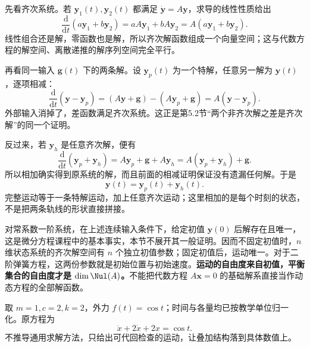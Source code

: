 \documentclass[a4paper,12pt,twoside,openany,fontset=none]{ctexbook}
\numberwithin{equation}{chapter}
\begin{document}
先看齐次系统。若 $\boldsymbol y_1(t),\boldsymbol y_2(t)$ 都满足 $\dot{\boldsymbol y}=A\boldsymbol y$，求导的线性性质给出
\begin{equation}
 \frac{\mathrm d}{\mathrm dt}(a\boldsymbol y_1+b\boldsymbol y_2)
 =aA\boldsymbol y_1+bA\boldsymbol y_2
 =A(a\boldsymbol y_1+b\boldsymbol y_2).
\end{equation}
线性组合还是解，零函数也是解，所以齐次解函数组成一个向量空间；这与代数方程的解空间、离散递推的解序列空间完全平行。

再看同一输入 $\boldsymbol g(t)$ 下的两条解。设 $\boldsymbol y_p(t)$ 为一个特解，任意另一解为 $\boldsymbol y(t)$，逐项相减：
\begin{equation}
 \frac{\mathrm d}{\mathrm dt}(\boldsymbol y-\boldsymbol y_p)
 =(A\boldsymbol y+\boldsymbol g)-(A\boldsymbol y_p+\boldsymbol g)
 =A(\boldsymbol y-\boldsymbol y_p).
\end{equation}
外部输入消掉了，差函数满足齐次系统。这正是第5.2节“两个非齐次解之差是齐次解”的同一个证明。

反过来，若 $\boldsymbol y_h$ 是任意齐次解，便有
\begin{equation}
 \frac{\mathrm d}{\mathrm dt}(\boldsymbol y_p+\boldsymbol y_h)
 =A\boldsymbol y_p+\boldsymbol g+A\boldsymbol y_h
 =A(\boldsymbol y_p+\boldsymbol y_h)+\boldsymbol g.
\end{equation}
所以相加确实得到原系统的解，而且前面的相减证明保证没有遗漏任何解。于是
\begin{equation}
 \boldsymbol y(t)=\boldsymbol y_p(t)+\boldsymbol y_h(t).
 \label{eq:five-continuous-superposition}
\end{equation}
完整运动等于一条特解运动，加上任意齐次运动；这里相加的是每个时刻的状态，不是把两条轨线的形状直接拼接。

对常系数一阶系统，在上述连续输入条件下，给定初值 $\boldsymbol y(0)$ 后解存在且唯一，这是微分方程课程中的基本事实，本节不展开其一般证明。因而不固定初值时，$n$ 维状态系统的齐次解空间有 $n$ 个独立初值参数；固定初值后，运动唯一。对于二阶弹簧方程，这两份参数就是初始位置与初始速度。\textbf{运动的自由度来自初值，平衡集合的自由度才是 $\dim\Nul(A)$。}不能把代数方程 $A\boldsymbol x=0$ 的基础解系直接当作动态方程的全部解函数。

取 $m=1,c=2,k=2$，外力 $f(t)=\cos t$；时间与各量均已按教学单位归一化。原方程为
\begin{equation}
 \ddot x+2\dot x+2x=\cos t.
\end{equation}
不推导通用求解方法，只给出可代回检查的运动，让叠加结构落到具体数值上。
\end{document}
